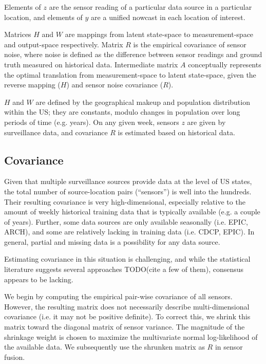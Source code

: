 \documentclass[10pt,letterpaper]{article}
\begin{document}
Elements of $z$ are the sensor reading of a particular data source in a
particular location, and elements of $y$ are a unified nowcast in each location
of interest.

Matrices $H$ and $W$ are mappings from latent state-space to measurement-space
and output-space respectively. Matrix $R$ is the empirical covariance of sensor
noise, where noise is defined as the difference between sensor readings and
ground truth measured on historical data. Intermediate matrix $A$ conceptually
represents the optimal translation from measurement-space to latent
state-space, given the reverse mapping ($H$) and sensor noise covariance ($R$).

$H$ and $W$ are defined by the geographical makeup and population distribution
within the US; they are constants, modulo changes in population over long
periods of time (e.g. years). On any given week, sensors $z$ are given by
surveillance data, and covariance $R$ is estimated based on historical data.

\subsection*{Covariance}

Given that multiple surveillance sources provide data at the level of US
states, the total number of source-location pairs (``sensors'') is well into
the hundreds. Their resulting covariance is very high-dimensional, especially
relative to the amount of weekly historical training data that is typically
available (e.g. a couple of years). Further, some data sources are only
available seasonally (i.e. EPIC, ARCH), and some are relatively lacking in
training data (i.e. CDCP, EPIC). In general, partial and missing data is a
possibility for any data source.

Estimating covariance in this situation is challenging, and while the
statistical literature suggests several approaches TODO(cite a few of them),
consensus appears to be lacking.

We begin by computing the empirical pair-wise covariance of all sensors.
However, the resulting matrix does not necessarily describe multi-dimensional
covariance (i.e. it may not be positive definite). To correct this, we shrink
this matrix toward the diagonal matrix of sensor variance. The magnitude of the
shrinkage weight is chosen to maximize the multivariate normal log-likelihood
of the available data. We subsequently use the shrunken matrix as $R$ in sensor
fusion.
\end{document}
